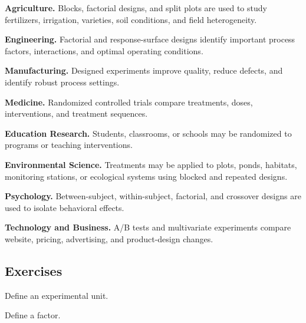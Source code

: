 \begin{applicationbox}

\textbf{Agriculture.}
Blocks, factorial designs, and split plots are used to study fertilizers,
irrigation, varieties, soil conditions, and field heterogeneity.

\medskip

\textbf{Engineering.}
Factorial and response-surface designs identify important process factors,
interactions, and optimal operating conditions.

\medskip

\textbf{Manufacturing.}
Designed experiments improve quality, reduce defects, and identify robust
process settings.

\medskip

\textbf{Medicine.}
Randomized controlled trials compare treatments, doses, interventions,
and treatment sequences.

\medskip

\textbf{Education Research.}
Students, classrooms, or schools may be randomized to programs or
teaching interventions.

\medskip

\textbf{Environmental Science.}
Treatments may be applied to plots, ponds, habitats, monitoring stations,
or ecological systems using blocked and repeated designs.

\medskip

\textbf{Psychology.}
Between-subject, within-subject, factorial, and crossover designs are
used to isolate behavioral effects.

\medskip

\textbf{Technology and Business.}
A/B tests and multivariate experiments compare website, pricing,
advertising, and product-design changes.

\end{applicationbox}

\subsection{Exercises}
\label{subsec:experimental-design-exercises}

\begin{exercise}[1]
Define an experimental unit.
\end{exercise}

\begin{exercise}[1]
Define a factor.
\end{exercise}

